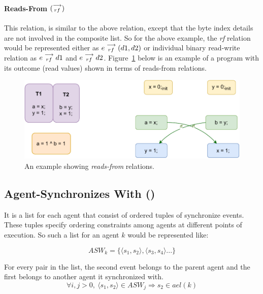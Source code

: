             \paragraph{Reads-From $(\stackrel{\longrightarrow}{_{rf}})$}
            This relation, is similar to the above relation, except that the byte index details are not involved in the composite list. So for the above example, the \textit{rf} relation would be represented either as   
                $e\stackrel{\longrightarrow}{_{rf}}(d1, d2)$
            or individual binary read-write relation as 
                $e\stackrel{\longrightarrow}{_{rf}}d1$ and $e\stackrel{\longrightarrow}{_{rf}}d2$.
            Figure~\ref{model:read-from} below is an example of a program with its outcome (read values) shown in terms of reads-from relations. 
            \begin{figure}[H]
                \centering
                \includegraphics[scale=0.7]{3.ECMAScriptMemoryModel/ReadsFrom.pdf}
                \caption{An example showing \textit{reads-from} relations.}
                \label{model:read-from}
            \end{figure}
            
        \subsection{Agent-Synchronizes With ()}
        
            It is a list for each agent that consist of ordered tuples of synchronize events. 
            These tuples specify ordering constraints among agents at different points of execution. 
            So such a list for an agent $k$ would be represented like:  

                \[ASW_k = \{ \langle s_1, s_2 \rangle, \langle s_3, s_4 \rangle ...\}\]
        
            For every pair in the list, the second event belongs to the parent agent and the first belongs to another agent it synchronized with\footnotemark.
                \[  
                    \forall{i,j>0},\ 
                    \langle s_1, s_2 \rangle \in ASW_j 
                    \Rightarrow{} 
                    s_2 \in ael(k)                        
                \]

